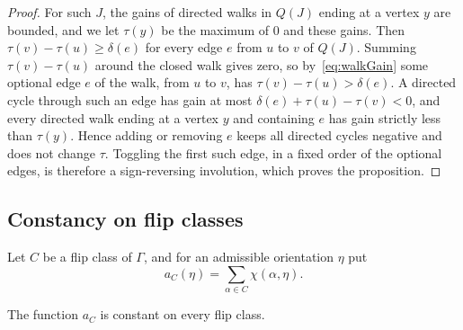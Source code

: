 \begin{proof}
For such $J$, the gains of directed walks in $Q(J)$ ending at a vertex $y$ are
bounded, and we let $\tau(y)$ be the maximum of $0$ and these gains.
Then $\tau(v)-\tau(u)\geq\delta(e)$ for every edge $e$ from $u$ to $v$ of $Q(J)$.
Summing $\tau(v)-\tau(u)$ around the closed walk gives zero, so
by~\eqref{eq:walkGain} some optional edge $e$ of the walk, from $u$ to $v$, has
$\tau(v)-\tau(u)>\delta(e)$.
A directed cycle through such an edge has gain at most $\delta(e)+\tau(u)-\tau(v)<0$,
and every directed walk ending at a vertex $y$ and containing $e$ has gain
strictly less than $\tau(y)$.
Hence adding or removing $e$ keeps all directed cycles negative and does not change
$\tau$.
Toggling the first such edge, in a fixed order of the optional edges, is
therefore a sign-reversing involution, which proves the proposition.
\end{proof}

\subsection{Constancy on flip classes}

Let $C$ be a flip class of $\Gamma$, and for an admissible orientation $\eta$ put
\[
 a_C(\eta)=\sum_{\alpha\in C}\chi(\alpha,\eta).
\]

\begin{lemma}\label{lem:constancy}
The function $a_C$ is constant on every flip class.
\end{lemma}

